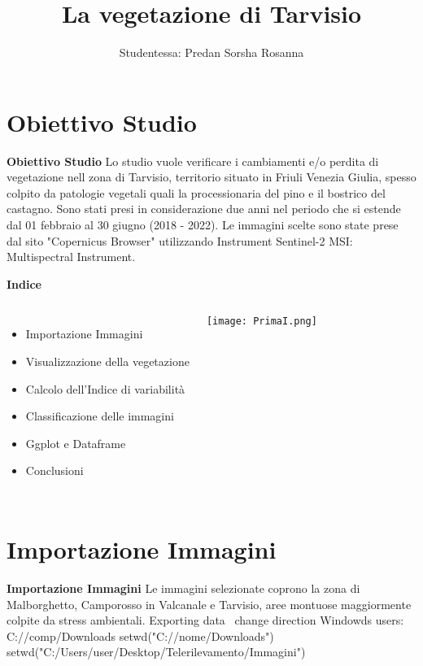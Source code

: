 \documentclass{beamer}
\title{\Large\textbf{La vegetazione di Tarvisio}}
\author{Studentessa: Predan Sorsha Rosanna }
\begin{document}
\maketitle

\AtBeginSection[] 


\section{Obiettivo Studio}

\begin{frame}
{\Large\textbf{Obiettivo Studio}}
 Lo studio vuole verificare i cambiamenti e/o perdita di vegetazione nell zona di Tarvisio, territorio situato in Friuli Venezia Giulia, spesso colpito da patologie vegetali quali la processionaria del pino e il bostrico del castagno. Sono stati presi in considerazione due anni nel periodo che si estende dal 01 febbraio al 30 giugno (2018 - 2022). Le immagini scelte sono state prese dal sito "Copernicus Browser" utilizzando Instrument Sentinel-2 MSI: Multispectral Instrument.
\end{frame}

\begin{frame}
{\Large\textbf{Indice}}
\begin{columns}
 \begin{itemize}
     \item Importazione Immagini
     \item Visualizzazione della vegetazione
     \item Calcolo dell'Indice di variabilità
     \item Classificazione delle immagini
     \item Ggplot e Dataframe
     \item Conclusioni
 \end{itemize}
    \texttt{[image: PrimaI.png]}
\end{columns}
\end{frame}

\section{Importazione Immagini}

\begin{frame}
{\Large\textbf{Importazione Immagini}}
Le immagini selezionate coprono la zona di Malborghetto, Camporosso in Valcanale e Tarvisio, aree montuose maggiormente colpite da stress ambientali.
\vspace{+1cm}
Exporting data
\ change direction
Windowds users: C://comp/Downloads
setwd("C://nome/Downloads")
setwd("C:/Users/user/Desktop/Telerilevamento/Immagini")
\end{frame}
\end{document}
